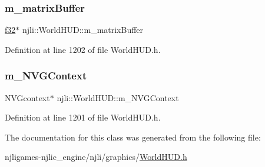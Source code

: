 \subsubsection{\texorpdfstring{m\+\_\+matrix\+Buffer}{m\_matrixBuffer}}
{\footnotesize\ttfamily \mbox{\hyperlink{_util_8h_a5f6906312a689f27d70e9d086649d3fd}{f32}}$\ast$ njli\+::\+World\+H\+U\+D\+::m\+\_\+matrix\+Buffer\hspace{0.3cm}{\ttfamily [private]}}



Definition at line 1202 of file World\+H\+U\+D.\+h.

\mbox{\label{classnjli_1_1_world_h_u_d_a08dbc205077c567128a8bc9c3d56fc3b}} 
\subsubsection{\texorpdfstring{m\+\_\+\+N\+V\+G\+Context}{m\_NVGContext}}
{\footnotesize\ttfamily N\+V\+Gcontext$\ast$ njli\+::\+World\+H\+U\+D\+::m\+\_\+\+N\+V\+G\+Context\hspace{0.3cm}{\ttfamily [private]}}



Definition at line 1201 of file World\+H\+U\+D.\+h.



The documentation for this class was generated from the following file\+:\begin{DoxyCompactItemize}
\item 
njligames-\/njlic\+\_\+engine/njli/graphics/\mbox{\hyperlink{_world_h_u_d_8h}{World\+H\+U\+D.\+h}}\end{DoxyCompactItemize}

